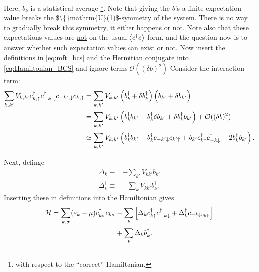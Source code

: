 Here, $b_k$ is a statistical average \footnote{with respect to the ``correct'' Hamiltonian.}. Note that giving the $b$'s a finite expectation value breaks the \$\textbackslash\{\}mathrm\{U\}(1)\$-symmetry of the system. There is no way to gradually break this symmetry, it either happens or not. Note also that these expectations values are \underline{not} on the usual $\ev{c^\dagger c}$-form, and the question now is to answer whether such expectation values can exist or not.
Now insert the definitions in \cref{eq:mft_bcs} and the Hermitian conjugate into \cref{eq:Hamiltonian_BCS} and ignore terms $\mathcal{O}((\delta b)^2)$
Consider the interaction term:
\begin{align*}
\sum_{k,k'}V_{k,k'} c^{\dagger}_{k,\uparrow}c^{\dagger}_{-k, \downarrow}c_{-k',\downarrow}c_{k,\uparrow}
 &= \sum_{k,k'}V_{k,k'} \left(b_k^\dagger + \delta b_k^\dagger\right)\left(b_{k'} + \delta b_{k'}\vphantom{b_k^\dagger}\right)\\
&= \sum_{k,k'}V_{k,k'}\left(b_k^\dagger b_{k'} + b_k^\dagger\delta b_{k'} + \delta b_k^\dagger b_{k'}\right) + \mathcal{O}((\delta b)^2)\\
&\simeq \sum_{k,k'}V_{k,k'}\left(b_k^\dagger b_{k'} + b_k^\dagger c_{-k'\downarrow}c_{k'\uparrow} + b_{k'}c^{\dagger}_{k\uparrow}c^{\dagger}_{-k\downarrow} - 2b^\dagger_kb_{k'}\right).
\end{align*}

Next, definge
\begin{subequations}
	\label{eq:defs_delta}
\begin{align}
	\Delta_k\equiv&-\sum_{k'}V_{kk'}b_{k'} \label{eq:def_delta1} \\
	\Delta_k^\dagger\equiv&-\sum_{k}V_{kk'}b_k^\dagger. \label{eq:def_delta2}
\end{align}
\end{subequations}
Inserting these in definitions into the Hamiltonian gives
\begin{align}
\label{eq:BCS_MFT}
	\begin{split}
	\mathcal{H} = \sum_{k,\sigma}(\varepsilon_k - \mu)c^{\dagger}_{k\sigma}c_{k\sigma} 
	&-\sum_k\left[\Delta_k c_{k\uparrow}^\dagger c_{-k\downarrow}^\dagger + \Delta_k^\dagger c_{-k\downarrow c_{k\uparrow}}\right] \\
	&+ \sum_k \Delta_k b_k^\dagger.
	\end{split}
\end{align}

